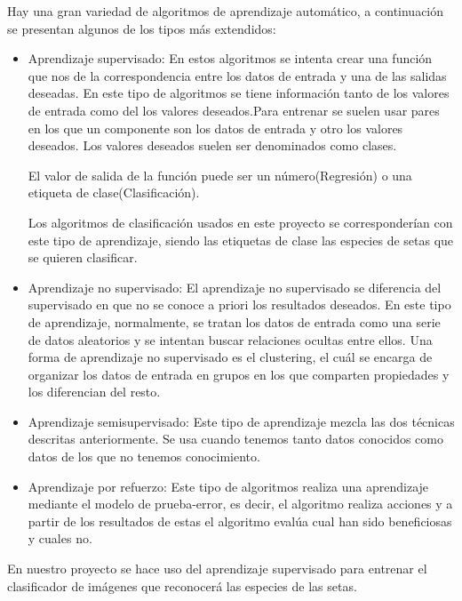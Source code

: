 Hay una gran variedad de algoritmos de aprendizaje automático, a continuación se presentan algunos de los tipos más extendidos:
\begin{itemize}

	\item{Aprendizaje supervisado}: En estos algoritmos se intenta crear una función que nos de la correspondencia entre los datos de entrada y una de las salidas deseadas. En este tipo de algoritmos se tiene información tanto de los valores de entrada como del los valores deseados.Para entrenar se suelen usar pares en los que un componente son los datos de entrada y otro los valores deseados. Los valores deseados suelen ser denominados como clases.~\cite{wiki:aprendizaheSupervisado}
	
	El valor de salida de la función puede ser un número(Regresión) o una etiqueta de clase(Clasificación).
	
	Los algoritmos de clasificación usados en este proyecto se corresponderían con este tipo de aprendizaje, siendo las etiquetas de clase las especies de setas que se quieren clasificar.
	
	\item{Aprendizaje no supervisado}: El aprendizaje no supervisado se diferencia del supervisado en que no se conoce a priori los resultados deseados. En este tipo de aprendizaje, normalmente, se tratan los datos de entrada como una serie de datos aleatorios y se intentan buscar relaciones ocultas entre ellos.
	Una forma de aprendizaje no supervisado es el clustering, el cuál se encarga de organizar los datos de entrada en grupos en los que comparten propiedades y los diferencian del resto.~\cite{wiki:aprendizajeNoSupervisado}
	
	\item{Aprendizaje semisupervisado}: Este tipo de aprendizaje mezcla las dos técnicas descritas anteriormente. Se usa cuando tenemos tanto datos conocidos como datos de los que no tenemos conocimiento.
	
	\item{Aprendizaje por refuerzo}: Este tipo de algoritmos realiza una aprendizaje mediante el modelo de prueba-error, es decir, el algoritmo realiza acciones y a partir de los resultados de estas el algoritmo evalúa cual han sido beneficiosas y cuales no.
\end{itemize}
	
En nuestro proyecto se hace uso del aprendizaje supervisado para entrenar el clasificador de imágenes que reconocerá las especies de las setas.
~\cite{wiki:aprendizajeAutomatico}

